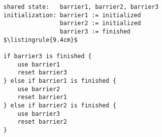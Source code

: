 \begin{center}
\begin{minipage}{\textwidth}
\begin{lstlisting}[mathescape, linewidth=9.4cm]
shared state:   barrier1, barrier2, barrier3
initialization: barrier1 := initialized
                barrier2 := initialized
                barrier3 := finished
$\listingrule{9.4cm}$

if barrier3 is finished {
	use barrier1
	reset barrier3
} else if barrier1 is finished {
	use barrier2
	reset barrier1
} else if barrier2 is finished {
	use barrier3
	reset barrier2
}
\end{lstlisting}
\end{minipage}
\end{center}
